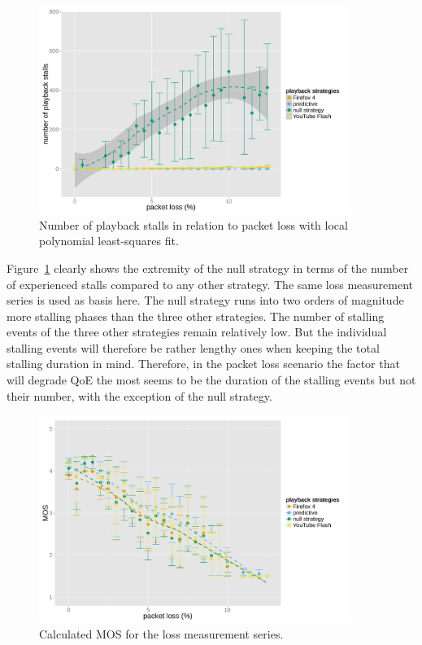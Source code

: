 \begin{figure}[htb]
	\centering
	\includegraphics[width=0.9\textwidth]{images/R-playbackemulation-stallnumber-loss.pdf}
	\caption{Number of playback stalls in relation to packet loss with local polynomial least-squares fit.}
\label{c3:fig:eval-loss-numstalls}
\end{figure}

Figure~\ref{c3:fig:eval-loss-numstalls} clearly shows the extremity of the null strategy in terms of the number of experienced stalls compared to any other strategy. The same loss measurement series is used as basis here. The null strategy runs into two orders of magnitude more stalling phases than the three other strategies. The number of stalling events of the three other strategies remain relatively low. But the individual stalling events will therefore be rather lengthy ones when keeping the total stalling duration in mind. Therefore, in the packet loss scenario the factor that will degrade \gls{QoE} the most seems to be the duration of the stalling events but not their number, with the exception of the null strategy.

\begin{figure}[htb]
	\centering
	\includegraphics[width=0.9\textwidth]{images/R-playbackemulation-qoe-loss.pdf}
	\caption{Calculated \acrshort{MOS} for the loss measurement series.}
\label{c3:fig:eval-loss-qoe}
\end{figure}

